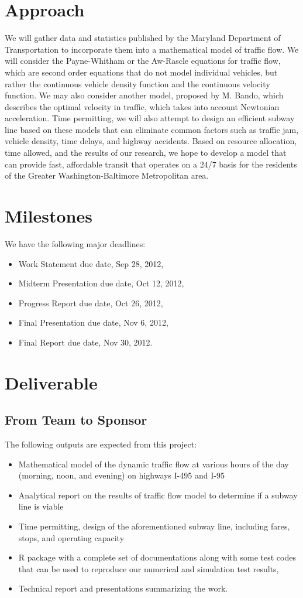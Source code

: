 \documentclass[12pt,letterpaper]{article}
\theoremstyle{definition}
\begin{document}
\section{Approach}
We will gather data and statistics published by the Maryland Department of Transportation to incorporate them into a mathematical model of traffic flow. We will consider the Payne-Whitham or the Aw-Rascle equations for traffic flow, which are second order equations that do not model individual vehicles, but rather the continuous vehicle density function and the continuous velocity function. We may also consider another model, proposed by M. Bando, which describes the optimal velocity in traffic, which takes into account Newtonian acceleration. Time permitting, we will also attempt to design an efficient subway line based on these models that can eliminate common factors such as traffic jam, vehicle density, time delays, and highway accidents. Based on resource allocation, time allowed, and the results of our research, we hope to develop a model that can provide fast, affordable transit that operates on a 24/7 basis for the residents of the Greater Washington-Baltimore Metropolitan area.
\section{Milestones}
We have the following major deadlines:
\begin{itemize}
    \item Work Statement due date, Sep 28, 2012,
    \item Midterm Presentation due date, Oct 12, 2012,
    \item Progress Report due date, Oct 26, 2012,
    \item Final Presentation due date, Nov 6, 2012,
    \item Final Report due date, Nov 30, 2012.
\end{itemize}

\section{Deliverable}
\subsection{From Team to Sponsor} %
The following outputs are expected from this project:
\begin{itemize}
    \item Mathematical model of the dynamic traffic flow at various hours of the day (morning, noon, and evening) on highways I-495 and I-95
    \item Analytical report on the results of traffic flow model to determine if a subway line is viable
    \item Time permitting, design of the aforementioned subway line, including fares, stops, and operating capacity
    \item R package with a complete set of documentations along with some test 
        codes that can be used to reproduce our numerical and simulation test
        results,
    \item Technical report and presentations summarizing the work. 
\end{itemize}
\end{document}
